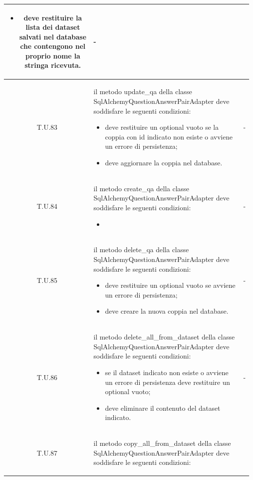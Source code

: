 \begin{tabularx}{\textwidth}{|c|X|c|}
    \begin{itemize}
        \item deve restituire la lista dei dataset salvati nel database che contengono nel proprio nome la stringa ricevuta. 
    \end{itemize} & - \\
    \hline 
    \label{tu:tu83} T.U.83 & il metodo update\_qa della classe SqlAlchemyQuestionAnswerPairAdapter deve soddisfare le seguenti condizioni:
    \begin{itemize}
        \item deve restituire un optional vuoto se la coppia con id indicato non esiste o avviene un errore di persistenza; 
        \item deve aggiornare la coppia nel database.
    \end{itemize} & - \\
    \hline 
    \label{tu:tu84} T.U.84 & il metodo create\_qa della classe SqlAlchemyQuestionAnswerPairAdapter deve soddisfare le seguenti condizioni:
    \begin{itemize}
        \item  
    \end{itemize} & - \\
    \hline 
    \label{tu:tu85} T.U.85 & il metodo delete\_qa della classe SqlAlchemyQuestionAnswerPairAdapter deve soddisfare le seguenti condizioni:
    \begin{itemize}
        \item deve restituire un optional vuoto se avviene un errore di persistenza;
        \item deve creare la nuova coppia nel database. 
    \end{itemize} & - \\
    \hline 
    \label{tu:tu86} T.U.86 & il metodo delete\_all\_from\_dataset della classe SqlAlchemyQuestionAnswerPairAdapter deve soddisfare le seguenti condizioni:
    \begin{itemize}
        \item se il dataset indicato non esiste o avviene un errore di persistenza deve restituire un optional vuoto;
        \item deve eliminare il contenuto del dataset indicato. 
    \end{itemize} & - \\
    \hline 
    \label{tu:tu87} T.U.87 & il metodo copy\_all\_from\_dataset della classe SqlAlchemyQuestionAnswerPairAdapter deve soddisfare le seguenti condizioni:
    \begin{itemize}

\end{itemize}
\end{tabularx}
